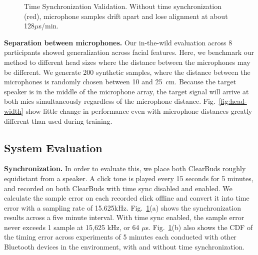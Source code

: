 \documentclass [11pt, proquest] {uwthesis}[2020/02/24]
\begin{document}
\begin{figure}
\centering     %
{}%
\vskip -0.15in
\caption{Time Synchronization Validation.  Without time synchronization (red), microphone samples drift apart and lose alignment at about 128$\mu$s/min.} %
\label{fig:sync}
\vskip -0.2in
\end{figure}

{\bf Separation between microphones.} Our in-the-wild evaluation across 8 participants showed  generalization across facial features. Here, we  benchmark our method  to different head sizes where the distance between the microphones may be different. We generate 200 synthetic samples, where the distance between the microphones is randomly chosen between 10 and 25~cm. Because the target speaker is in the middle of the microphone array, the target signal will arrive at both mics simultaneously regardless of the microphone distance.  Fig.~\ref{fig:head-width} show little change in performance even with microphone distances greatly different than used during training.




\subsection{System   Evaluation}
{\bf Synchronization.}  In order to evaluate this, we place both ClearBuds roughly equidistant from a speaker. A {click tone} is played every 15 seconds for 5 minutes, and recorded on both ClearBuds with time sync disabled and enabled. We calculate the sample error on each recorded click offline and convert it into time error with a sampling rate of 15.625kHz.
Fig.~\ref{fig:sync}(a) shows the synchronization  results across a five minute interval. With time sync enabled, the sample error never exceeds 1 sample at 15,625 kHz, or 64 $\mu$s. Fig.~\ref{fig:sync}(b) also shows the CDF of the timing error across  experiments of 5 minutes each conducted with other Bluetooth devices in the environment,  with and without time synchronization.  
\end{document}
